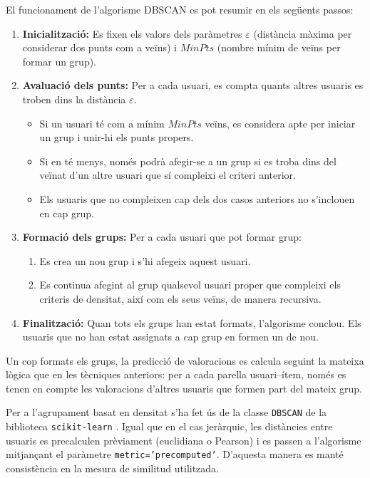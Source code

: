 \documentclass[a4paper,12pt]{report}
\begin{document}
El funcionament de l’algorisme DBSCAN es pot resumir en els següents passos:

\begin{enumerate}
    \item \textbf{Inicialització:} Es fixen els valors dels paràmetres \(\varepsilon\) (distància màxima per considerar dos punts com a veïns) i \(\mathit{MinPts}\) (nombre mínim de veïns per formar un grup).
    
    \item \textbf{Avaluació dels punts:} Per a cada usuari, es compta quants altres usuaris es troben dins la distància \(\varepsilon\).
    \begin{itemize}
        \item Si un usuari té com a mínim \(\mathit{MinPts}\) veïns, es considera apte per iniciar un grup i unir-hi els punts propers.
        \item Si en té menys, només podrà afegir-se a un grup si es troba dins del veïnat d’un altre usuari que sí compleixi el criteri anterior.
        \item Els usuaris que no compleixen cap dels dos casos anteriors no s’inclouen en cap grup.
    \end{itemize}
    
    \item \textbf{Formació dels grups:} Per a cada usuari que pot formar grup:
    \begin{enumerate}
        \item Es crea un nou grup i s’hi afegeix aquest usuari.
        \item Es continua afegint al grup qualsevol usuari proper que compleixi els criteris de densitat, així com els seus veïns, de manera recursiva.
    \end{enumerate}
    
    \item \textbf{Finalització:} Quan tots els grups han estat formats, l’algorisme conclou. Els usuaris que no han estat assignats a cap grup en formen un de nou.
\end{enumerate}

Un cop formats els grups, la predicció de valoracions es calcula seguint la mateixa lògica que en les tècniques anteriors: per a cada parella usuari–ítem, només es tenen en compte les valoracions d’altres usuaris que formen part del mateix grup.

Per a l’agrupament basat en densitat s'ha fet ús de la classe \texttt{DBSCAN} de la biblioteca \texttt{scikit-learn} \cite{pedregosa2011scikit}. Igual que en el cas jeràrquic, les distàncies entre usuaris es precalculen prèviament (euclidiana o Pearson) i es passen a l’algorisme mitjançant el paràmetre \texttt{metric='precomputed'}. D’aquesta manera es manté consistència en la mesura de similitud utilitzada.
\end{document}
